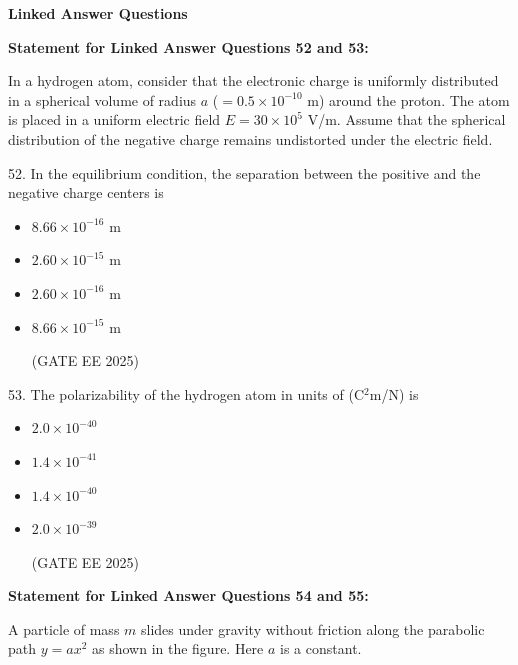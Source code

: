 \documentclass[twocolumn]{article}
\begin{document}
\textbf{Linked Answer Questions}

\textbf{Statement for Linked Answer Questions 52 and 53:}

In a hydrogen atom, consider that the electronic charge is uniformly distributed in a spherical volume of radius $a$ ($= 0.5 \times 10^{-10}$ m) around the proton.  
The atom is placed in a uniform electric field $E = 30 \times 10^{5}$ V/m.  
Assume that the spherical distribution of the negative charge remains undistorted under the electric field.



52. In the equilibrium condition, the separation between the positive and the negative charge centers is

\begin{itemize}
\item[(A)] $8.66 \times 10^{-16}$ m

\item[(B)] $2.60 \times 10^{-15}$ m

\item[(C)] $2.60 \times 10^{-16}$ m

\item[(D)] $8.66 \times 10^{-15}$ m

(GATE EE 2025)
  \end{itemize}




53. The polarizability of the hydrogen atom in units of (C$^2$m/N) is

\begin{itemize}
\item[(A)] $2.0 \times 10^{-40}$

\item[(B)] $1.4 \times 10^{-41}$

\item[(C)] $1.4 \times 10^{-40}$

\item[(D)] $2.0 \times 10^{-39}$

(GATE EE 2025)
  \end{itemize}




\textbf{Statement for Linked Answer Questions 54 and 55:}

A particle of mass $m$ slides under gravity without friction along the parabolic path $y = a x^2$ as shown in the figure. Here $a$ is a constant.
\end{document}
